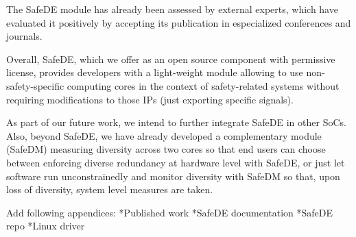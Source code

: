 \documentclass[a4paper,12pt]{article}
\begin{document}
The SafeDE module has already been assessed by external experts, which have evaluated it positively by accepting its publication in especialized conferences and journals.

Overall, SafeDE, which we offer as an open source component with permissive license, provides developers with a light-weight module allowing to use non-safety-specific computing cores in the context of safety-related systems without requiring modifications to those IPs (just exporting specific signals). 

As part of our future work, we intend to further integrate SafeDE in other SoCs. Also, beyond SafeDE, we have already developed a complementary module (SafeDM) measuring diversity across two cores so that end users can choose between enforcing diverse redundancy at hardware level with SafeDE, or just let software run unconstrainedly and monitor diversity with SafeDM so that, upon loss of diversity, system level measures are taken. 

\newpage

\medskip



\clearpage
\newpage

\begin{appendices}

{Add following appendices: 
*Published work
*SafeDE documentation
*SafeDE repo
*Linux driver
}

\end{appendices}
\end{document}

